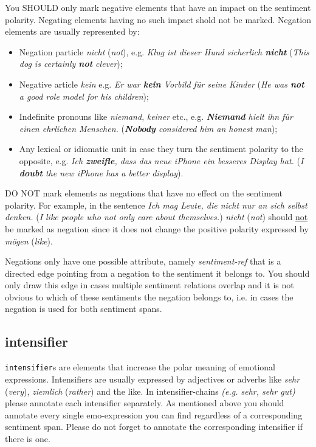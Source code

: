 \documentclass[11pt,a4paper]{article}
\begin{document}
\vspace{0.5cm}
You SHOULD only mark negative elements that have an impact on the
sentiment polarity. Negating elements having no such impact
shold not be marked. Negation elements are usually represented by:
\begin{itemize}
\item Negation particle \textit{nicht} (\textit{not}),
  e.g. \textit{Klug ist dieser Hund sicherlich \textbf{nicht}}
  (\textit{This dog is certainly \textbf{not} clever});

\item Negative article \textit{kein} e.g. \textit{Er war
  \textbf{kein} Vorbild f\"ur seine Kinder} (\textit{He was
  \textbf{not} a good role model for his children});

\item Indefinite pronouns like \textit{niemand}, \textit{keiner}
  etc., e.g. \textit{\textbf{Niemand} hielt ihn f\"ur einen
    ehrlichen Menschen.} (\textit{\textbf{Nobody} considered him an
    honest man});

\item Any lexical or idiomatic unit in case they turn the sentiment
  polarity to the opposite, e.g. \textit{Ich \textbf{zweifle}, dass
    das neue iPhone ein besseres Display hat.} (\textit{I
    \textbf{doubt} the new iPhone has a better display}).
\end{itemize}

DO NOT mark elements as negations that have no effect on the sentiment
polarity. For example, in the sentence \textit{Ich mag Leute, die nicht
  nur an sich selbst denken.} (\textit{I like people who not only care
  about themselves.}) \textit{nicht} (\textit{not}) should \underline{not} be
marked as negation since it does not change the positive polarity
expressed by \textit{m\"ogen} (\textit{like}).
\vspace{0.5cm}

Negations only have one possible attribute, namely
\textit{sentiment-ref} that is a directed edge pointing from a negation
to the sentiment it belongs to. You should only draw this edge in cases multiple sentiment 
relations overlap and it is not obvious to which of these sentiments the negation belongs to,
i.e. in cases the negation is used for both sentiment spans.


\subsection{intensifier}
\texttt{intensifier}s are elements that increase the polar
meaning of emotional expressions. Intensifiers are usually expressed
by adjectives or adverbs like \textit{sehr} (\textit{very}),
\textit{ziemlich} (\textit{rather}) and the like. In intensifier-chains 
\textit{(e.g. sehr, sehr gut)} please annotate each intensifier separately.
As mentioned above you should annotate every single emo-expression you can 
find regardless of a corresponding sentiment span. 
Please do not forget to annotate the corresponding intensifier if there is one. \newline
\end{document}

